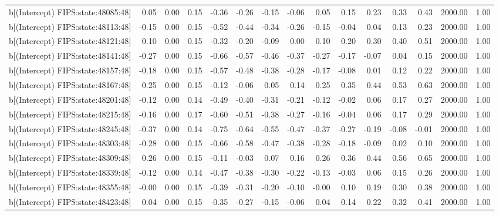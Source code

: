 \begin{table}[ht]
\begin{tabular}{rrrrrrrrrrrrrrr}
  b[(Intercept) FIPS:state:48085:48] & 0.05 & 0.00 & 0.15 & -0.36 & -0.26 & -0.15 & -0.06 & 0.05 & 0.15 & 0.23 & 0.33 & 0.43 & 2000.00 & 1.00 \\ 
  b[(Intercept) FIPS:state:48113:48] & -0.15 & 0.00 & 0.15 & -0.52 & -0.44 & -0.34 & -0.26 & -0.15 & -0.04 & 0.04 & 0.13 & 0.23 & 2000.00 & 1.00 \\ 
  b[(Intercept) FIPS:state:48121:48] & 0.10 & 0.00 & 0.15 & -0.32 & -0.20 & -0.09 & 0.00 & 0.10 & 0.20 & 0.30 & 0.40 & 0.51 & 2000.00 & 1.00 \\ 
  b[(Intercept) FIPS:state:48141:48] & -0.27 & 0.00 & 0.15 & -0.66 & -0.57 & -0.46 & -0.37 & -0.27 & -0.17 & -0.07 & 0.04 & 0.15 & 2000.00 & 1.00 \\ 
  b[(Intercept) FIPS:state:48157:48] & -0.18 & 0.00 & 0.15 & -0.57 & -0.48 & -0.38 & -0.28 & -0.17 & -0.08 & 0.01 & 0.12 & 0.22 & 2000.00 & 1.00 \\ 
  b[(Intercept) FIPS:state:48167:48] & 0.25 & 0.00 & 0.15 & -0.12 & -0.06 & 0.05 & 0.14 & 0.25 & 0.35 & 0.44 & 0.53 & 0.63 & 2000.00 & 1.00 \\ 
  b[(Intercept) FIPS:state:48201:48] & -0.12 & 0.00 & 0.14 & -0.49 & -0.40 & -0.31 & -0.21 & -0.12 & -0.02 & 0.06 & 0.17 & 0.27 & 2000.00 & 1.00 \\ 
  b[(Intercept) FIPS:state:48215:48] & -0.16 & 0.00 & 0.17 & -0.60 & -0.51 & -0.38 & -0.27 & -0.16 & -0.04 & 0.06 & 0.17 & 0.29 & 2000.00 & 1.00 \\ 
  b[(Intercept) FIPS:state:48245:48] & -0.37 & 0.00 & 0.14 & -0.75 & -0.64 & -0.55 & -0.47 & -0.37 & -0.27 & -0.19 & -0.08 & -0.01 & 2000.00 & 1.00 \\ 
  b[(Intercept) FIPS:state:48303:48] & -0.28 & 0.00 & 0.15 & -0.66 & -0.58 & -0.47 & -0.38 & -0.28 & -0.18 & -0.09 & 0.02 & 0.10 & 2000.00 & 1.00 \\ 
  b[(Intercept) FIPS:state:48309:48] & 0.26 & 0.00 & 0.15 & -0.11 & -0.03 & 0.07 & 0.16 & 0.26 & 0.36 & 0.44 & 0.56 & 0.65 & 2000.00 & 1.00 \\ 
  b[(Intercept) FIPS:state:48339:48] & -0.12 & 0.00 & 0.14 & -0.47 & -0.38 & -0.30 & -0.22 & -0.13 & -0.03 & 0.06 & 0.15 & 0.26 & 2000.00 & 1.00 \\ 
  b[(Intercept) FIPS:state:48355:48] & -0.00 & 0.00 & 0.15 & -0.39 & -0.31 & -0.20 & -0.10 & -0.00 & 0.10 & 0.19 & 0.30 & 0.38 & 2000.00 & 1.00 \\ 
  b[(Intercept) FIPS:state:48423:48] & 0.04 & 0.00 & 0.15 & -0.35 & -0.27 & -0.15 & -0.06 & 0.04 & 0.14 & 0.22 & 0.32 & 0.41 & 2000.00 & 1.00 \\ 

\end{tabular}
\end{table}
